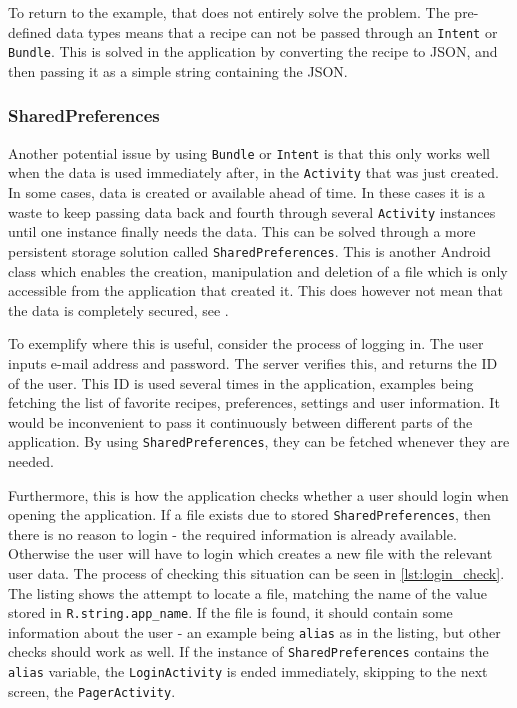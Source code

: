 To return to the example, that does not entirely solve the problem. The pre-defined data types means that a recipe can not be passed through an \texttt{Intent} or \texttt{Bundle}. This is solved in the application by converting the recipe to JSON, and then passing it as a simple string containing the JSON.

\subsubsection{SharedPreferences}
\label{subsubsec:sharedpreferences}

Another potential issue by using \texttt{Bundle} or \texttt{Intent} is that this only works well when the data is used immediately after, in the \texttt{Activity}  that was just created. In some cases, data is created or available ahead of time. In these cases it is a waste to keep passing data back and fourth through several \texttt{Activity} instances until one instance finally needs the data. This can be solved through a more persistent storage solution called \texttt{SharedPreferences}. This is another Android class which enables the creation, manipulation and deletion of a file which is only accessible from the application that created it\cite{sharedpreferences}. This does however not mean that the data is completely secured, see \citep{sharedpreferences_security}.

To exemplify where this is useful, consider the process of logging in. The user inputs e-mail address and password. The server verifies this, and returns the ID of the user. This ID is used several times in the application, examples being fetching the list of favorite recipes, preferences, settings and user information. It would be inconvenient to pass it continuously between different parts of the application. By using \texttt{SharedPreferences}, they can be fetched whenever they are needed.

Furthermore, this is how the application checks whether a user should login when opening the application. If a file exists due to stored \texttt{SharedPreferences}, then there is no reason to login - the required information is already available. Otherwise the user will have to login which creates a new file with the relevant user data. The process of checking this situation can be seen in \ref{lst:login_check}. The listing shows the attempt to locate a file, matching the name of the value stored in \texttt{R.string.app\_name}. If the file is found, it should contain some information about the user - an example being \texttt{alias} as in the listing, but other checks should work as well. If the instance of \texttt{SharedPreferences} contains the \texttt{alias} variable, the \texttt{LoginActivity} is ended immediately, skipping to the next screen, the \texttt{PagerActivity}.

